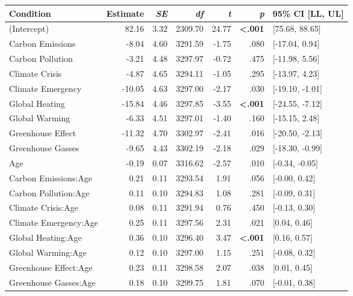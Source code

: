\begin{table}[ht]
\centering
\begin{tabular}{lrrrrrl}
  \hline
Condition & Estimate & \textit{SE} & \textit{df} & \textit{t} & \textit{p} & 95\% CI [LL, UL] \\ 
  \hline
(Intercept) & 82.16 & 3.32 & 2309.70 & 24.77 & \textbf{\textless  .001} & [75.68, 88.65] \\ 
  Carbon Emissions & -8.04 & 4.60 & 3291.59 & -1.75 & .080 & [-17.04, 0.94] \\ 
  Carbon Pollution & -3.21 & 4.48 & 3297.97 & -0.72 & .475 & [-11.98, 5.56] \\ 
  Climate Crisis & -4.87 & 4.65 & 3294.11 & -1.05 & .295 & [-13.97, 4.23] \\ 
  Climate Emergency & -10.05 & 4.63 & 3297.00 & -2.17 & .030 & [-19.10, -1.01] \\ 
  Global Heating & -15.84 & 4.46 & 3297.85 & -3.55 & \textbf{\textless  .001} & [-24.55, -7.12] \\ 
  Global Warming & -6.33 & 4.51 & 3297.01 & -1.40 & .160 & [-15.15, 2.48] \\ 
  Greenhouse Effect & -11.32 & 4.70 & 3302.97 & -2.41 & .016 & [-20.50, -2.13] \\ 
  Greenhouse Gasses & -9.65 & 4.43 & 3302.19 & -2.18 & .029 & [-18.30, -0.99] \\ 
  Age & -0.19 & 0.07 & 3316.62 & -2.57 & .010 & [-0.34, -0.05] \\ 
  Carbon Emissions:Age & 0.21 & 0.11 & 3293.54 & 1.91 & .056 & [-0.00, 0.42] \\ 
  Carbon Pollution:Age & 0.11 & 0.10 & 3294.83 & 1.08 & .281 & [-0.09, 0.31] \\ 
  Climate Crisis:Age & 0.08 & 0.11 & 3291.94 & 0.76 & .450 & [-0.13, 0.30] \\ 
  Climate Emergency:Age & 0.25 & 0.11 & 3297.56 & 2.31 & .021 & [0.04, 0.46] \\ 
  Global Heating:Age & 0.36 & 0.10 & 3296.40 & 3.47 & \textbf{\textless  .001} & [0.16, 0.57] \\ 
  Global Warming:Age & 0.12 & 0.10 & 3297.00 & 1.15 & .251 & [-0.08, 0.32] \\ 
  Greenhouse Effect:Age & 0.23 & 0.11 & 3298.58 & 2.07 & .038 & [0.01, 0.45] \\ 
  Greenhouse Gasses:Age & 0.18 & 0.10 & 3299.75 & 1.81 & .070 & [-0.01, 0.38] \\ 
   \hline
\end{tabular}
\end{table}
